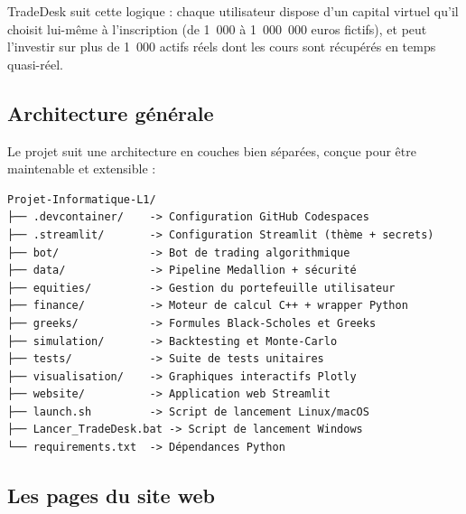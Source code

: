 \documentclass[a4paper, 12pt, twoside]{article}
\begin{document}
TradeDesk suit cette logique : chaque utilisateur dispose d'un capital
virtuel qu'il choisit lui-même à l'inscription (de 1~000 à 1~000~000
euros fictifs), et peut l'investir sur plus de 1~000 actifs réels dont
les cours sont récupérés en temps quasi-réel.

\subsection{Architecture générale}

Le projet suit une architecture en couches bien séparées, conçue pour
être maintenable et extensible :

\begin{verbatim}
Projet-Informatique-L1/
├── .devcontainer/    -> Configuration GitHub Codespaces
├── .streamlit/       -> Configuration Streamlit (thème + secrets)
├── bot/              -> Bot de trading algorithmique
├── data/             -> Pipeline Medallion + sécurité
├── equities/         -> Gestion du portefeuille utilisateur
├── finance/          -> Moteur de calcul C++ + wrapper Python
├── greeks/           -> Formules Black-Scholes et Greeks
├── simulation/       -> Backtesting et Monte-Carlo
├── tests/            -> Suite de tests unitaires
├── visualisation/    -> Graphiques interactifs Plotly
├── website/          -> Application web Streamlit
├── launch.sh         -> Script de lancement Linux/macOS
├── Lancer_TradeDesk.bat -> Script de lancement Windows
└── requirements.txt  -> Dépendances Python
\end{verbatim}

\subsection{Les pages du site web}
\end{document}
